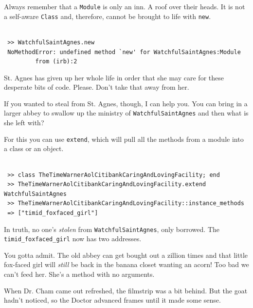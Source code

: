 \documentclass[10pt,twoside]{report}
\begin{document}
Always remember that a \lstinline[breaklines=true]|Module| is only an
inn.  A roof over their heads.  It is not a self-aware
\lstinline[breaklines=true]|Class| and, therefore, cannot be brought
to life with \lstinline[breaklines=true]|new|.


\begin{lstlisting}

 >> WatchfulSaintAgnes.new
 NoMethodError: undefined method `new' for WatchfulSaintAgnes:Module
         from (irb):2

\end{lstlisting}


St. Agnes has given up her whole life in order that she may care for
these desperate bits of code. Please.  Don't take that away from her.

If you wanted to steal from St. Agnes, though, I can help you. You can
bring in a larger abbey to swallow up the ministry of
\lstinline[breaklines=true]|WatchfulSaintAgnes| and then what is she
left with?

For this you can use \lstinline[breaklines=true]|extend|, which will
pull all the methods from a module into a class or an object.


\begin{lstlisting}

 >> class TheTimeWarnerAolCitibankCaringAndLovingFacility; end
 >> TheTimeWarnerAolCitibankCaringAndLovingFacility.extend WatchfulSaintAgnes
 >> TheTimeWarnerAolCitibankCaringAndLovingFacility::instance_methods
 => ["timid_foxfaced_girl"]

\end{lstlisting}


In truth, no one's {\em stolen} from
\lstinline[breaklines=true]|WatchfulSaintAgnes|, only borrowed.  The
\lstinline[breaklines=true]|timid_foxfaced_girl| now has two
addresses.

You gotta admit.  The old abbey can get bought out a zillion times and
that little fox-faced girl will {\em still} be back in the banana
closet wanting an acorn!  Too bad we can't feed her. She's a method
with no arguments.

When Dr. Cham came out refreshed, the filmstrip was a bit behind.  But
the goat hadn't noticed, so the Doctor advanced frames until it made
some sense.

\newpage
\end{document}

